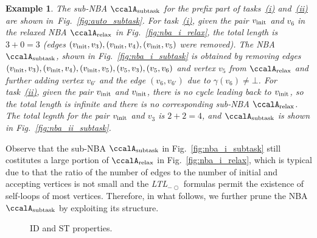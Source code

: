 \documentclass[Afour,sageh,times]{sagej}
\newtheorem{exmp}{Example}
\newcommand{\ltl}{ {\it LTL}$_{-\bigcirc}$ }
\newcommand{\auto}[1]{\ccalA_{\textup{#1}}}
\newcommand{\vertex}[1]{v_{\textup{#1}}}
\newenvironment{cexmp}
{\addtocounter{exmp}{-1}\begin{exmp}}
  {\end{exmp}}
\begin{document}
     \begin{cexmp}
       The sub-NBA $\auto{subtask}$ for the prefix part of tasks~\hyperref[task:i]{\it (i)} and~\hyperref[task:i]{\it (ii)} are shown in~Fig.~\ref{fig:auto_subtask}. For task~\hyperref[task:i]{\it (i)}, given the pair $\vertex{init}$ and $v_6$ in the relaxed NBA $\auto{relax}$ in Fig.~\ref{fig:nba_i_relax}, the total length is $3+0=3$ (edges $(\vertex{init}, v_3), (\vertex{init}, v_4), (\vertex{init}, v_5)$ were removed). The NBA $\auto{subtask}$, shown in  Fig.~\ref{fig:nba_i_subtask} is obtained by removing edges $(\vertex{init}, v_3), (\vertex{init}, v_4), (\vertex{init}, v_5), (v_5, v_3),  (v_5, v_6)$ and vertex $v_5$ from $\auto{relax}$ and further adding vertex $v_{6'}$ and the edge $(v_6, v_{6'})$ due to $\gamma(v_6)\neq \bot$. For task~\hyperref[task:i]{\it (ii)}, given the pair $\vertex{init}$ and $\vertex{init}$,  there is no cycle leading back to $\vertex{init}$, so the total length is infinite and there is no corresponding sub-NBA $\auto{relax}$. The total legnth for the pair $\vertex{init}$ and $v_3$ is $2+2=4$, and $\auto{subtask}$ is shown in  Fig.~\ref{fig:nba_ii_subtask}.
     \end{cexmp}

Observe that the sub-NBA $\auto{subtask}$ in Fig.~\ref{fig:nba_i_subtask} still costitutes a large portion of  $\auto{relax}$ in Fig.~\ref{fig:nba_i_relax}, which is typical due to that the ratio of the number of edges to the number of initial and accepting vertices is not small and the \ltl formulas permit the existence of self-loops of most vertices. Therefore, in what follows, we further prune the NBA $\auto{subtask}$  by exploiting its structure.

\begin{figure}
  \centering
  \caption{ID and ST properties.}\label{fig:property}
\end{figure}
\end{document}

